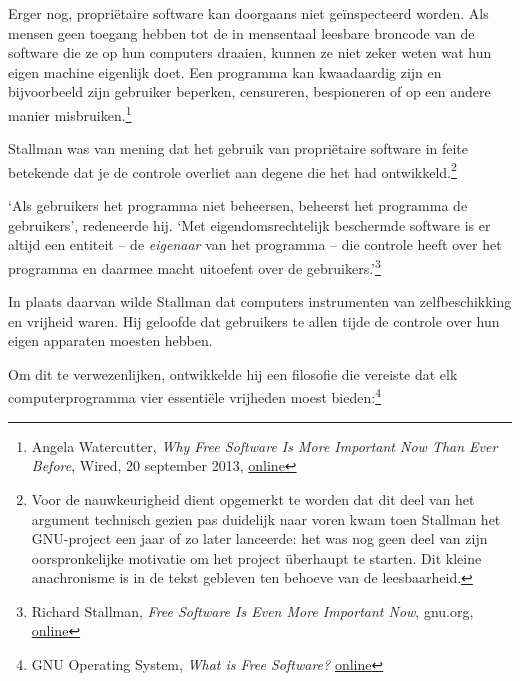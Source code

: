\documentclass[
  a5paper,
  smalldemyvopaper,11pt,twoside,onecolumn,openright,extrafontsizes,
hidelinks]{memoir}
\begin{document}
Erger nog, propriëtaire software kan doorgaans niet geïnspecteerd
worden. Als mensen geen toegang hebben tot de in mensentaal leesbare
broncode van de software die ze op hun computers draaien, kunnen ze niet
zeker weten wat hun eigen machine eigenlijk doet. Een programma kan
kwaadaardig zijn en bijvoorbeeld zijn gebruiker beperken, censureren,
bespioneren of op een andere manier misbruiken.\footnote{\hspace{0pt}Angela
  Watercutter, \emph{Why Free Software Is More Important Now Than Ever
  Before}, Wired, 20 september 2013,
  \href{https://www.wired.com/2013/09/why-free-software-is-more-important-now-than-ever-before/}{online}}

Stallman was van mening dat het gebruik van propriëtaire software in
feite betekende dat je de controle overliet aan degene die het had
ontwikkeld.\footnote{Voor de nauwkeurigheid dient opgemerkt te worden
  dat dit deel van het argument technisch gezien pas duidelijk naar
  voren kwam toen Stallman het GNU-project een jaar of zo later
  lanceerde: het was nog geen deel van zijn oorspronkelijke motivatie om
  het project überhaupt te starten. Dit kleine anachronisme is in de
  tekst gebleven ten behoeve van de leesbaarheid.}

`Als gebruikers het programma niet beheersen, beheerst het programma de
gebruikers', redeneerde hij. `Met eigendomsrechtelijk beschermde
software is er altijd een entiteit -- de \emph{eigenaar} van het
programma -- die controle heeft over het programma en daarmee macht
uitoefent over de gebruikers.'\footnote{\hspace{0pt}Richard Stallman,
  \emph{Free Software Is Even More Important Now}, gnu.org,
  \href{https://www.gnu.org/philosophy/free-software-even-more-important.en.html}{online}}

In plaats daarvan wilde Stallman dat computers instrumenten van
zelfbeschikking en vrijheid waren. Hij geloofde dat gebruikers te allen
tijde de controle over hun eigen apparaten moesten hebben.

Om dit te verwezenlijken, ontwikkelde hij een filosofie die vereiste dat
elk computerprogramma vier essentiële vrijheden moest bieden:\footnote{\hspace{0pt}GNU
  Operating System, \emph{What is Free Software?}
  \href{https://www.gnu.org/philosophy/free-sw.html}{online}}
\end{document}
